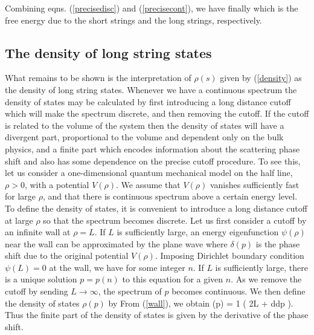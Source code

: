 Combining eqns. (\ref{precisedisc}) and (\ref{precisecont}), we have finally
which is the free energy due to the short strings and the long strings, 
respectively.


\subsection{The density of long string states}

What remains to be shown is the interpretation of  $\rho(s)$
given by (\ref{density}) as  the density of long string
states. Whenever we have a continuous spectrum the density of states may be
calculated by first introducing a long distance cutoff which will make the 
spectrum discrete, and then removing the cutoff. If the cutoff is related 
to the volume of the system then the density of states will have a 
divergent part, proportional to the volume and dependent only on the bulk
physics, and a finite part which encodes information about the scattering
phase shift and also has some dependence on the precise cutoff procedure. 
To see this, let us consider a one-dimensional
quantum mechanical model on the half line, $\rho > 0$, with a potential
$V(\rho)$. We assume that $V(\rho)$ vanishes sufficiently fast 
for large $\rho$, and that there is continuous spectrum above a certain
energy level. To define the density of states, it is convenient 
to introduce a long distance cutoff at large $\rho$ so 
that the spectrum becomes discrete. 
Let us first consider a cutoff by an infinite wall at $\rho=L$.
If $L$ is sufficiently large,  an energy eigenfunction $\psi(\rho)$
near the wall can be approximated by the plane wave 
where $\delta(p)$ is the phase shift
due to the original potential $V(\rho)$.  Imposing 
Dirichlet boundary condition $\psi(L) = 0$ at the wall, we have 
for some integer $n$. 
If $L$ is sufficiently large, there is a unique solution $p=p(n)$
to this equation for a given $n$. As we remove the
cutoff by sending $L \rightarrow \infty$, the spectrum of $p$ becomes
continuous. We then define the density of states $\rho(p)$ by
 From (\ref{wall}), we obtain
{  \rho(p) = {1 \pi}\left( 2L + {d\delta \over dp} \right). }
Thus the finite part of the density of states is given by
the derivative of the phase shift. 

